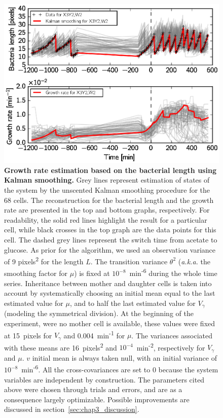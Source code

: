 \begin{figure}[p]
\centering
\includegraphics[scale=1]{./Fig/growth_rate_estimation}
\caption{
\textbf{Growth rate estimation based on the bacterial length using Kalman smoothing.}
Grey lines represent estimation of states of the system by the unscented Kalman smoothing procedure for the 68 cells.
The reconstruction for the bacterial length and the growth rate are presented in the top and bottom graphs, respectively.
For readability, the solid red lines highlight the result for a particular cell, while black crosses in the top graph are the data points for this cell.
The dashed grey lines represent the switch time from acetate to glucose.
As prior for the algorithm, we used an observation variance of 9 pixels\textsuperscript{2} for the length $L$.
The transition variance $\theta^2$ (\textit{a.k.a.} the smoothing factor for $\mu$) is fixed at $10^{-8}$~min\textsuperscript{-6} during the whole time series.
Inheritance between mother and daughter cells is taken into account by systematically choosing an initial mean equal to the last estimated value for $\mu$, and to half the last estimated value for $V_\gamma$ (modeling the symmetrical division).
At the beginning of the experiment, were no mother cell is available, these values were fixed at 15~pixels for $V_\gamma$ and 0.004~min\textsuperscript{-1} for $\mu$.
The variances associated with these means are 16~pixels\textsuperscript{2} and $10^{-4}$~min\textsuperscript{-2}, respectively for $V_\gamma$ and $\mu$.
$v$ initial mean is always taken null, with an initial variance of $10^{-8}$~min\textsuperscript{-6}.
All the cross-covariances are set to 0 because the system variables are independent by construction.
The parameters cited above were chosen through trials and errors, and are as a consequence largely optimizable.
Possible improvements are discussed in section~\ref{sec:chap3_discussion}.
}
\label{fig:growth_rate_estimation}
\end{figure}


